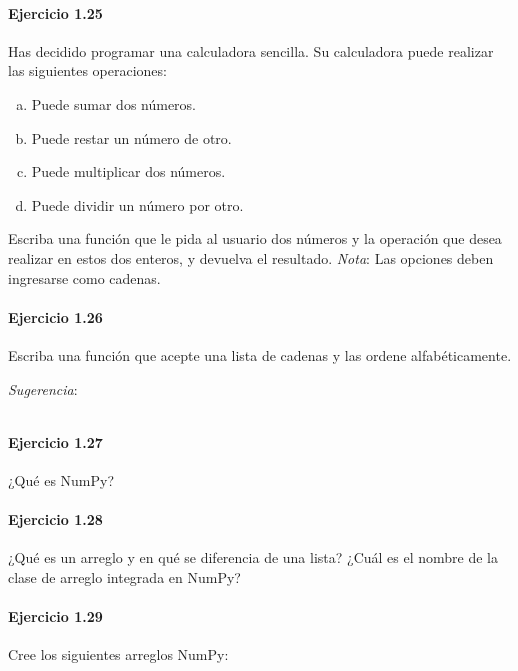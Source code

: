 \paragraph{\color{DarkBlue}Ejercicio 1.25}
Has decidido programar una calculadora sencilla.
Su calculadora puede realizar las siguientes operaciones:
\begin{multicols}{2}
	\begin{enumerate}[(a)]
		\item

		      Puede sumar dos números.
		\item

		      Puede restar un número de otro.

		\item

		      Puede multiplicar dos números.

		\item

		      Puede dividir un número por otro.
	\end{enumerate}
\end{multicols}

Escriba una función que le pida al usuario dos números y la operación
que desea realizar en estos dos enteros, y devuelva el resultado.
\emph{Nota}: Las opciones deben ingresarse como cadenas.

\paragraph{\color{DarkBlue}Ejercicio 1.26}
Escriba una función que acepte una lista de cadenas y las ordene
alfabéticamente.

\emph{Sugerencia}:
\begin{listing}[ht!]
	\inputminted{python}{1.26.py}
\end{listing}

\paragraph{\color{DarkBlue}Ejercicio 1.27}
¿Qué es NumPy?

\paragraph{\color{DarkBlue}Ejercicio 1.28}
¿Qué es un arreglo y en qué se diferencia de una lista?
¿Cuál es el nombre de la clase de arreglo integrada en NumPy?

\paragraph{\color{DarkBlue}Ejercicio 1.29}
Cree los siguientes arreglos NumPy:

